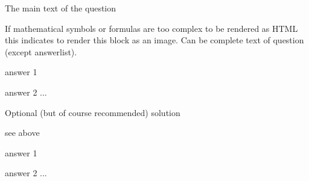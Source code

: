 
\begin{question}           %

  The main text of the question

  \begin{image}            %
    If mathematical symbols or formulas are too complex to be rendered
    as HTML this indicates to render this block as an image. Can be
    complete text of question (except answerlist).
  \end{image}

  \begin{answerlist}      %
   \item answer 1
   \item answer 2
    ...
  \end{answerlist}

\end{question}

\begin{solution}           %

  Optional (but of course recommended) solution

  \begin{image}            %
    see above
  \end{image}

  \begin{answerlist}      %
   \item answer 1
   \item answer 2
    ...
  \end{answerlist}
  
\end{solution}




